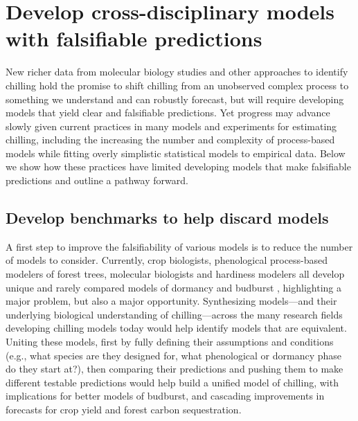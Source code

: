 \documentclass[11pt]{article}
\begin{document}
\section*{Develop cross-disciplinary models with falsifiable predictions} 
New richer data from molecular biology studies and other approaches to identify chilling \citep{fouche2023transport,walde2024stable} hold the promise to shift chilling from an unobserved complex process to something we understand and can robustly forecast, but will require developing models that yield clear and falsifiable predictions. Yet progress may advance slowly given current practices in many models and experiments for estimating chilling, including the increasing the number and complexity of process-based models while fitting overly simplistic statistical models to empirical data. Below we show how these practices have limited developing  models that make falsifiable predictions and outline a pathway forward. 

\subsection*{Develop benchmarks to help discard models} 
A first step to improve the falsifiability of various models is to reduce the number of models to consider. Currently, crop biologists, phenological process-based modelers of forest trees, molecular biologists and hardiness modelers all develop unique and rarely compared models of dormancy and budburst \citep[but see][]{kovaleskipreprint}, highlighting a major problem, but also a major opportunity. Synthesizing models---and their underlying biological understanding of chilling---across the many research fields developing chilling models today would help identify models that are equivalent.  Uniting these models, first by fully defining their assumptions and conditions (e.g., what species are they designed for, what phenological or dormancy phase do they start at?), then comparing their predictions and pushing them to make different testable predictions would help build a unified model of chilling, with implications for better models of budburst, and cascading improvements in forecasts for crop yield and forest carbon sequestration. 
\end{document}
